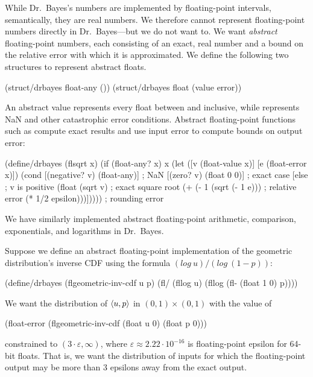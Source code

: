 \documentclass{llncs}
\begin{document}
While Dr.~Bayes's numbers are implemented by floating-point intervals, semantically, they are real numbers.
We therefore cannot represent floating-point numbers directly in Dr.~Bayes---but we do not want to.
We want \emph{abstract} floating-point numbers, each consisting of an exact, real number and a bound on the relative error with which it is approximated.
We define the following two structures to represent abstract floats.
\vspace{-0.5\baselineskip}
\begin{center}
\begin{schemedisplay}
(struct/drbayes float-any ())
(struct/drbayes float (value error))
\end{schemedisplay}
\end{center}
An abstract value  represents every float between  and  inclusive, while  represents NaN and other catastrophic error conditions.
Abstract floating-point functions such as  compute exact results and use input error to compute bounds on output error:
\vspace{-0.5\baselineskip}
\begin{center}
\begin{schemedisplay}
(define/drbayes (flsqrt x)
  (if (float-any? x)
      x
      (let ([v  (float-value x)]
            [e  (float-error x)])
        (cond [(negative? v)  (float-any)]  ; NaN
              [(zero? v)      (float 0 0)]  ; exact case
              [else  ; v is positive
               (float (sqrt v)                   ; exact square root
                      (+ (- 1 (sqrt (- 1 e)))    ; relative error
                         (* 1/2 epsilon)))]))))  ; rounding error
\end{schemedisplay}
\end{center}
We have similarly implemented abstract floating-point arithmetic, comparison, exponentials, and logarithms in Dr.~Bayes.

Suppose we define an abstract floating-point implementation of the geometric distribution's inverse CDF using the formula $(log~u){/}(log~(1-p))$:
\vspace{-0.5\baselineskip}
\begin{center}
\begin{schemedisplay}
(define/drbayes (flgeometric-inv-cdf u p)
  (fl/ (fllog u) (fllog (fl- (float 1 0) p))))
\end{schemedisplay}
\end{center}
We want the distribution of $\langle{u,p}\rangle$ in $(0,1) \times (0,1)$ with the value of
\vspace{-0.5\baselineskip}
\begin{center}
\begin{schemedisplay}
(float-error (flgeometric-inv-cdf (float u 0) (float p 0)))
\end{schemedisplay}
\end{center}
constrained to $(3 \cdot \varepsilon,\infty)$, where $\varepsilon \approx 2.22\cdot 10^{-16}$ is floating-point epsilon for 64-bit floats.
That is, we want the distribution of inputs for which the floating-point output may be more than $3$ epsilons away from the exact output.
\end{document}
